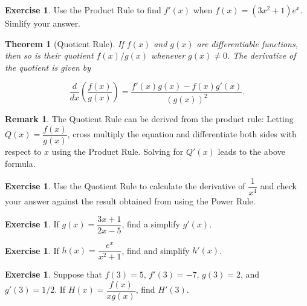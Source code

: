 \documentclass[11pt,reqno,final]{amsart}
\numberwithin{figure}{section}
\newtheorem*{theorem*}{Theorem}%
\theoremstyle{definition} %
\newtheorem{remark}[equation]{Remark}%
\newtheorem{exercise}[question]{Exercise}
\begin{document}
\begin{exercise}
        Use the Product Rule to find $f'(x)$ when $f(x) = (3x^2+1)e^x$. Simlify your answer.
        \vfill
\end{exercise}

\begin{theorem*}[Quotient Rule]
        If $f(x)$ and $g(x)$ are differentiable functions, then so is their quotient $f(x)/g(x)$ whenever $g(x) \neq 0$.
        The derivative of the quotient is given by
        \begin{framed}
                \[
                        \dfrac{d}{dx} \left( \dfrac{f(x)}{g(x)} \right) = \dfrac{f'(x)g(x) - f(x)g'(x)}{(g(x))^2}.
                \]
        \end{framed}
\end{theorem*}

\begin{remark}
        The Quotient Rule can be derived from the product rule:
        Letting $Q(x) = \dfrac{f(x)}{g(x)}$, cross multiply the equation and differentiate both sides with respect to $x$ using the Product Rule.
        Solving for $Q'(x)$ leads to the above formula.
\end{remark}

\newpage

\begin{exercise}
        Use the Quotient Rule to calculate the derivative of $\dfrac{1}{x^4}$ and check your answer against the result obtained from using the Power Rule.
        \vfill
\end{exercise}

\begin{exercise}
        If $g(x) = \dfrac{3x+1}{2x-5}$, find a simplify $g'(x)$.
        \vfill
\end{exercise}

\begin{exercise}
        If $h(x) = \dfrac{e^x}{x^2+1}$, find and simplify $h'(x)$.
        \vfill
\end{exercise}

\begin{exercise}
        Suppose that $f(3) = 5$, $f'(3) = -7$, $g(3) = 2$, and $g'(3) = 1/2$.
        If $H(x) = \dfrac{f(x)}{x g(x)}$, find $H'(3)$.
        \vfill
\end{exercise}
\end{document}
